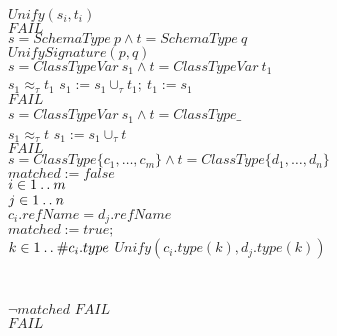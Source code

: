 \begin{algorithmic}[1]
$Unify(s_i, t_i)$ \TEND\\
\STATE \nexti\nexti\nexti\TELSE $FAIL$\\
\STATE \nexti\nexti\TELSE\TIF $s = SchemaType~p \land t = SchemaType~q$ \TTHEN\label{myline}\\
\STATE \nexti\nexti\nexti $UnifySignature(p, q)$\label{alg:unify-signature}\\
\STATE \nexti\nexti\TELSE\TIF $s=ClassTypeVar~s_1 \land t=ClassTypeVar~t_1$ \TTHEN
      \label{alg:start-var-class-types}\\
\STATE \nexti\nexti\nexti \TIF $s_1 \approx_{\tau} t_1$ \TTHEN%
 $s_1 := s_1 \cup_{\tau} t_1;~ t_1 := s_1$\\
\STATE \nexti\nexti\nexti \TELSE $FAIL$\\
\STATE \nexti\nexti\TELSE\TIF $s = ClassTypeVar~s_1 \land t =
ClassType\mathrel{\_}$~~\TTHEN\\
\STATE \nexti\nexti\nexti\TIF $s_1 \approx_{\tau} t$ \TTHEN $s_1 := s_1 \cup_{\tau} t$\\
\STATE \nexti\nexti\nexti\TELSE $FAIL$\label{alg:end-var-class-types}\\
\STATE \nexti\nexti\TELSE\TIF $s = ClassType \{c_1, \ldots, c_m\} \land t =
   ClassType\{d_1, \ldots, d_n\}$ \TTHEN\label{alg:state-ground-class-types}\\
\STATE \nexti\nexti{} $matched := false$\\
\STATE \nexti\nexti\nexti\TFOR $i \in 1 \mathbin{\mathstrut{\ldotp\ldotp}} m$ \TDO\\
\STATE \nexti\nexti\nexti\nexti\TFOR $j \in 1 \mathbin{\mathstrut{\ldotp\ldotp}} n$ \TDO\\
\STATE \nexti\nexti\nexti\nexti\nexti\TIF $c_i.refName = d_j.refName$ \TTHEN\\
\STATE \nexti\nexti\nexti\nexti\nexti\nexti$matched := true;$\\
\STATE \nexti\nexti\nexti\nexti\nexti\nexti\TFOR  $k \in 1 \mathbin{\mathstrut{\ldotp\ldotp}}
\#c_i.type$ \TDO $Unify(c_i.type(k), d_j.type(k))$ \TEND\\
\STATE \nexti\nexti\nexti\nexti\TEND\\
\STATE \nexti\nexti\nexti\TEND\\
\STATE \nexti\nexti\nexti\TIF $\lnot matched$ \TTHEN $FAIL$\label{alg:end-ground-class-types}\\
\STATE \nexti\nexti\TELSE $FAIL$\\
\STATE \nexti\TEND
\end{algorithmic}
